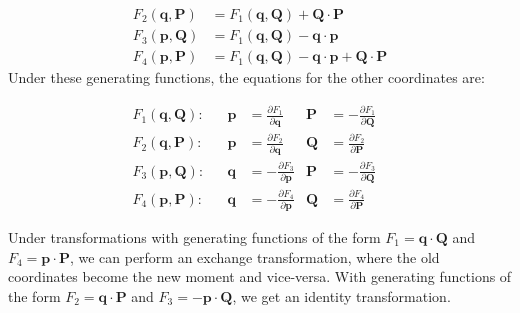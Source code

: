 \documentclass[10pt,landscape]{article}
\begin{document}
\begin{multicols}{3}
\begin{align}
	F_2(\mathbf{q}, \mathbf{P}) &= F_1(\mathbf{q},\mathbf{Q})+\mathbf{Q}\cdot\mathbf{P} \\
	F_3(\mathbf{p}, \mathbf{Q}) &= F_1(\mathbf{q},\mathbf{Q})-\mathbf{q}\cdot \mathbf{p} \\
	F_4(\mathbf{p}, \mathbf{P}) &= F_1(\mathbf{q},\mathbf{Q})-\mathbf{q}\cdot\mathbf{p}+\mathbf{Q}\cdot\mathbf{P}
\end{align}
Under these generating functions, the equations for the other coordinates are:

\begin{align}
	F_1(\mathbf{q}, \mathbf{Q}): &&
	\mathbf{p} &= \frac{\partial F_1}{\partial \mathbf{q}} & 
	\mathbf{P} &= -\frac{\partial F_1}{\partial \mathbf{Q}} & \\
	F_2(\mathbf{q}, \mathbf{P}): &&
	\mathbf{p} &= \frac{\partial F_2}{\partial \mathbf{q}} & 
	\mathbf{Q} &= \frac{\partial F_2}{\partial \mathbf{P}} & \\
	F_3(\mathbf{p}, \mathbf{Q}): &&
	\mathbf{q} &= -\frac{\partial F_3}{\partial \mathbf{p}} & 
	\mathbf{P} &= -\frac{\partial F_3}{\partial \mathbf{Q}} & \\
	F_4(\mathbf{p}, \mathbf{P}): &&
	\mathbf{q} &= -\frac{\partial F_4}{\partial \mathbf{p}} & 
	\mathbf{Q} &= \frac{\partial F_4}{\partial \mathbf{P}} &
\end{align}

Under transformations with generating functions of the form $F_1=\mathbf{q}\cdot\mathbf{Q}$ and $F_4=\mathbf{p}\cdot\mathbf{P}$, we can perform an exchange transformation, where the old coordinates become the new moment and vice-versa. With generating functions of the form $F_2=\mathbf{q}\cdot\mathbf{P}$ and $F_3=-\mathbf{p}\cdot\mathbf{Q}$, we get an identity transformation.

\end{multicols}
\end{document}
